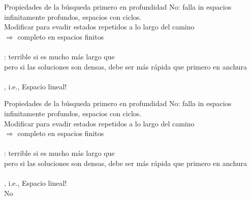 \documentclass{beamer}
\theoremstyle{definition}
\theoremstyle{theorem}
\theoremstyle{remark}
\begin{document}
\begin{frame}{Propiedades de la b\'usqueda primero en profundidad}
     No: falla in espacios infinitamente profundos, espacios con ciclos.\\
    \quad Modificar para evadir estados repetidos a lo largo del camino\\
    \quad $\Rightarrow$ completo en espacios finitos\\~\\
        
    : terrible si  es mucho m\'as largo que \\
    \quad pero si las soluciones son densas, debe ser m\'as r\'apida que primero en anchura\\~\\
        
    , i.e., Espacio lineal!\\
    
\end{frame}


\begin{frame}{Propiedades de la b\'usqueda primero en profundidad}
     No: falla in espacios infinitamente profundos, espacios con ciclos.\\
    \quad Modificar para evadir estados repetidos a lo largo del camino\\
    \quad $\Rightarrow$ completo en espacios finitos\\~\\
        
    : terrible si  es mucho m\'as largo que \\
    \quad pero si las soluciones son densas, debe ser m\'as r\'apida que primero en anchura\\~\\
        
    , i.e., Espacio lineal!\\
     No
    
\end{frame}
\end{document}
